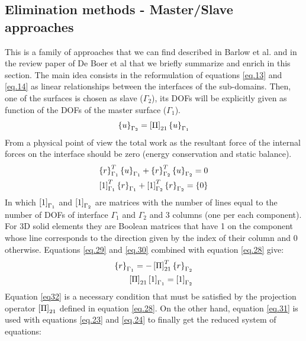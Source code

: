   \subsection{Elimination methods - Master/Slave  approaches}\label{ssec33}
  This is a family of approaches that we can find described in Barlow et al. \cite{barlow1982constraint} and in the review paper of De Boer et al \cite{de2007review} that we briefly summarize and enrich in this section. The main idea consists in the reformulation of equations \eqref{eq.13} and \eqref{eq.14} as linear relationships between the interfaces of the sub-domains. Then, one of the surfaces is chosen as slave ($\Gamma_2$), its DOFs will be explicitly given as function of the DOFs of the master surface ($\Gamma_1$).  
  \begin{equation}
  \label{eq.28}
  \left\lbrace{u}\right \rbrace_{\Gamma_2}=\left[{\Pi}\right]_{21}\left\lbrace{u}\right \rbrace_{\Gamma_1}
  \end{equation}
  From a physical point of view the total work as the resultant force  of the internal forces on the interface should be zero (energy conservation and static balance).
  \begin{eqnarray}
  \label{eq.29}
  \left\lbrace{r}\right \rbrace_{\Gamma_1}^T\left\lbrace{u}\right \rbrace_{\Gamma_1}+\left\lbrace{r}\right \rbrace_{\Gamma_2}^T\left\lbrace{u}\right \rbrace_{\Gamma_2}=0\\
  \label{eq.30}
  \left[{1}\right]_{\Gamma_1}^T\left\lbrace{r}\right \rbrace_{\Gamma_1}+\left[{1}\right]_{\Gamma_2}^T\left\lbrace{r}\right \rbrace_{\Gamma_2}=\left\lbrace{0}\right \rbrace
  \end{eqnarray}
  In which $\left[{1}\right]_{\Gamma_1}$ and $\left[{1}\right]_{\Gamma_2}$ are matrices with the number of lines equal to the number of DOFs of interface ${\Gamma_1}$ and ${\Gamma_2}$ and 3 columns (one per each component). For 3D solid elements they are Boolean matrices that have 1 on the component whose line corresponds to the direction given by the index of their column and 0 otherwise. 
   Equations \eqref{eq.29} and \eqref{eq.30} combined with equation \eqref{eq.28} give:
  \begin{eqnarray}
  \label{eq.31}
  \left\lbrace{r}\right \rbrace_{\Gamma_1}=-\left[{\Pi}\right]_{21}^T\left\lbrace{r}\right \rbrace_{\Gamma_2}\\
  \label{eq32}
  \left[{\Pi}\right]_{21}\left[{1}\right]_{\Gamma_1}=\left[{1}\right]_{\Gamma_2}
  \end{eqnarray}
  Equation \eqref{eq32} is a necessary condition that must be satisfied by the projection operator $\left[{\Pi}\right]_{21}$ defined in equation \eqref{eq.28}. On the other hand, equation \eqref{eq.31} is used with equations \eqref{eq.23} and \eqref{eq.24} to finally get the reduced system of equations:
